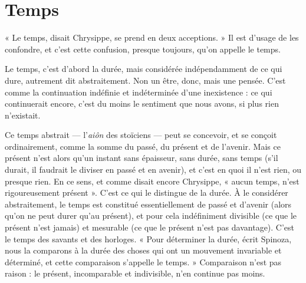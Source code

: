 \section{Temps}
« Le temps, disait Chrysippe, se prend en deux acceptions. » Il est
d’usage de les confondre, et c’est cette confusion, presque toujours,
qu’on appelle le temps.

Le temps, c’est d’abord la durée, mais considérée indépendamment de ce
qui dure, autrement dit abstraitement. Non un être, donc, mais une pensée.
C’est comme la continuation indéfinie et indéterminée d’une inexistence : ce
qui continuerait encore, c’est du moins le sentiment que nous avons, si plus
rien n'existait.

Ce temps abstrait — l’{\it aiôn} des stoïciens — peut se concevoir, et se conçoit
ordinairement, comme la somme du passé, du présent et de l’avenir. Mais ce
présent n’est alors qu’un instant sans épaisseur, sans durée, sans temps (s’il
durait, il faudrait le diviser en passé et en avenir), et c’est en quoi il n’est rien,
ou presque rien. En ce sens, et comme disait encore Chrysippe, « aucun temps,
n’est rigoureusement présent ». C’est ce qui le distingue de la durée. À le considérer
abstraitement, le temps est constitué essentiellement de passé et d’avenir
(alors qu’on ne peut durer qu’au présent), et pour cela indéfiniment divisible
(ce que le présent n’est jamais) et mesurable (ce que le présent n’est pas davantage).
C’est le temps des savants et des horloges. « Pour déterminer la durée,
écrit Spinoza, nous la comparons à la durée des choses qui ont un mouvement
invariable et déterminé, et cette comparaison s’appelle le temps. » Comparaison
n’est pas raison : le présent, incomparable et indivisible, n’en continue pas
moins.

